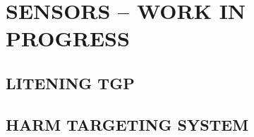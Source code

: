 \chapter{SENSORS -- WORK IN PROGRESS}
\localtableofcontents
\cleardoublepage

\section{LITENING TGP}

\clearpage 

\section{HARM TARGETING SYSTEM}

\cleardoublepage